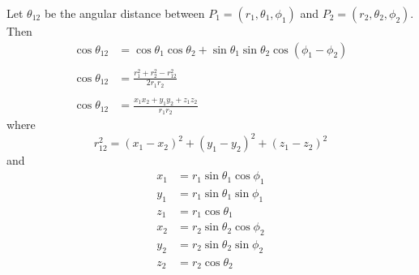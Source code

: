 \documentclass[12pt]{article}
\begin{document}
\noindent
Let $\theta_{12}$ be the angular distance between
$P_1=(r_1,\theta_1,\phi_1)$ and
$P_2=(r_2,\theta_2,\phi_2)$.
Then
\begin{align*}
\cos\theta_{12}
&=\cos\theta_1\cos\theta_2+\sin\theta_1\sin\theta_2\cos(\phi_1-\phi_2)
\\
\\
\cos\theta_{12}
&=\frac{r_1^2+r_2^2-r_{12}^2}{2r_1r_2}
\\
\\
\cos\theta_{12}
&=\frac{x_1x_2+y_1y_2+z_1z_2}{r_1r_2}
\end{align*}
where
\begin{equation*}
r_{12}^2=(x_1-x_2)^2+(y_1-y_2)^2+(z_1-z_2)^2
\end{equation*}
and
\begin{align*}
x_1&=r_1\sin\theta_1\cos\phi_1
\\
y_1&=r_1\sin\theta_1\sin\phi_1
\\
z_1&=r_1\cos\theta_1
\end{align*}
\begin{align*}
x_2&=r_2\sin\theta_2\cos\phi_2
\\
y_2&=r_2\sin\theta_2\sin\phi_2
\\
z_2&=r_2\cos\theta_2
\end{align*}
\end{document}
